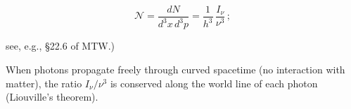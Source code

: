 \documentclass[aps,prd,twocolumn,superscriptaddress,nofootinbib]{revtex4-2}
\begin{document}
\begin{equation}
\mathscr{N} = \frac{dN}{d^3x\,d^3p} = \frac{1}{h^3}\,\frac{I_\nu}{\nu^3}\,;
\tag{2.6.11}
\end{equation}

see, e.g., \S22.6 of MTW.)

When photons propagate freely through curved spacetime (no interaction with
matter), the ratio $I_\nu/\nu^3$ is conserved along the world line of each photon
(Liouville's theorem).


\end{document}
